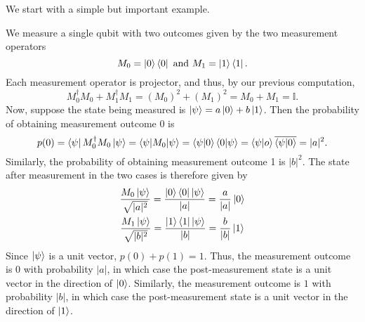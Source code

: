 We start with a simple but important example.
\begin{example} \label{measurement-standard basis}
We measure a single qubit with two outcomes given by the two measurement operators 
$$M_0=\ket{0}\bra{0}\textrm{ and }M_1=\ket{1}\bra{1}.$$ 
Each measurement operator is projector, and thus, by our previous computation,
\begin{equation*}
    M_0^\dagger M_0+M_1^\dagger M_1 = (M_0)^2+(M_1)^2=M_0 + M_1 = \mathbb{I}.
\end{equation*}
Now, suppose the state being measured is $\ket{\psi}=a\ket{0}+b\ket{1}$. Then the probability of obtaining measurement outcome 0 is
\begin{equation*}
    p(0) = \bra{\psi}M_0^\dagger M_0 \ket{\psi} = \braket{\psi | M_0 | \psi}=\braket{\psi|0}\braket{0|\psi}=\braket{\psi|o}\overline{\braket{\psi|0}}=|a|^2.
\end{equation*}
Similarly, the probability of obtaining measurement outcome 1 is $|b|^2$.
The state after measurement in the two cases is therefore given by
\begin{gather*}
    \frac{M_0 \ket{\psi}}{\sqrt{|a|^2}}=\frac{\ket{0}\bra{0}\ket{\psi}}{|a|}=\frac{a}{|a|}\ket{0}\\
    \frac{M_1 \ket{\psi}}{\sqrt{|b|^2}}=\frac{\ket{1}\bra{1}\ket{\psi}}{|b|}=\frac{b}{|b|}\ket{1}\\   
\end{gather*}
Since $\ket{\psi}$ is a unit vector, $p(0)+p(1)=1$.  Thus, the measurement outcome is $0$ with probability $|a|$, in which case the post-measurement state is a unit vector in the direction of $\ket{0}$.  Similarly, the measurement outcome is $1$ with probability $|b|$, in which case the post-measurement state is a unit vector in the direction of $\ket{1}$.
\end{example}


